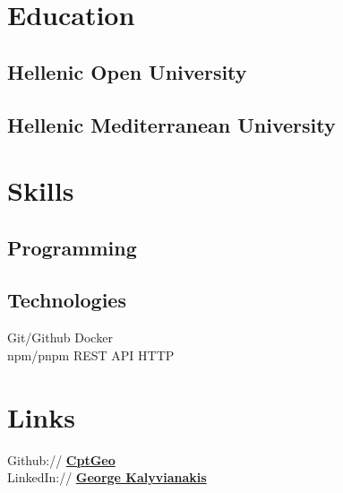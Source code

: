 \documentclass[]{deedy-resume-reversed}
\begin{document}
\begin{minipage}[t]{0.30\textwidth}


\section{Education}

\subsection{Hellenic Open University}
\sectionsep

\subsection{Hellenic Mediterranean University}
\sectionsep


\section{Skills}
\subsection{Programming}
\sectionsep

\subsection{Technologies}
Git/Github \textbullet{} Docker \\
npm/pnpm \textbullet{} REST API \textbullet{} HTTP \\
\sectionsep


\section{Links}
Github:// \href{https://github.com/CptGeo}{\bf CptGeo} \\
LinkedIn://  \href{https://www.linkedin.com/in/george-kalyvianakis/}{\bf George Kalyvianakis}
\sectionsep

\end{minipage}
\end{document}
